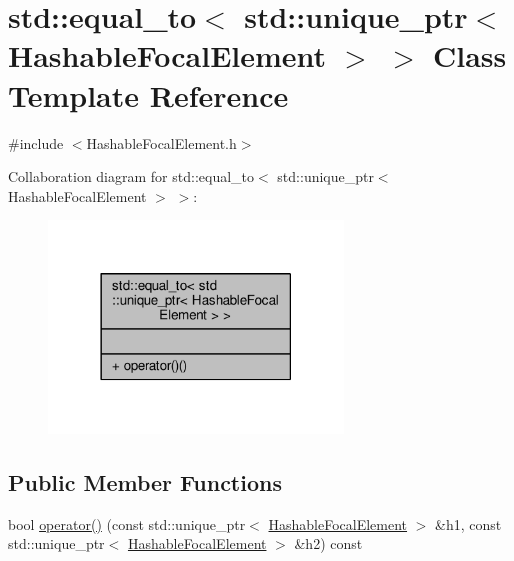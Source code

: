 \hypertarget{classstd_1_1equal__to_3_01std_1_1unique__ptr_3_01HashableFocalElement_01_4_01_4}{}\section{std\+:\+:equal\+\_\+to$<$ std\+:\+:unique\+\_\+ptr$<$ Hashable\+Focal\+Element $>$ $>$ Class Template Reference}
\label{classstd_1_1equal__to_3_01std_1_1unique__ptr_3_01HashableFocalElement_01_4_01_4}


{\ttfamily \#include $<$Hashable\+Focal\+Element.\+h$>$}



Collaboration diagram for std\+:\+:equal\+\_\+to$<$ std\+:\+:unique\+\_\+ptr$<$ Hashable\+Focal\+Element $>$ $>$\+:\nopagebreak
\begin{figure}[H]
\begin{center}
\leavevmode
\includegraphics[width=222pt]{classstd_1_1equal__to_3_01std_1_1unique__ptr_3_01HashableFocalElement_01_4_01_4__coll__graph}
\end{center}
\end{figure}
\subsection*{Public Member Functions}
\begin{DoxyCompactItemize}
\item 
bool \hyperlink{classstd_1_1equal__to_3_01std_1_1unique__ptr_3_01HashableFocalElement_01_4_01_4_af20c9282247edd90edb92e620fadc5f4}{operator()} (const std\+::unique\+\_\+ptr$<$ \hyperlink{classHashableFocalElement}{Hashable\+Focal\+Element} $>$ \&h1, const std\+::unique\+\_\+ptr$<$ \hyperlink{classHashableFocalElement}{Hashable\+Focal\+Element} $>$ \&h2) const 
\end{DoxyCompactItemize}


